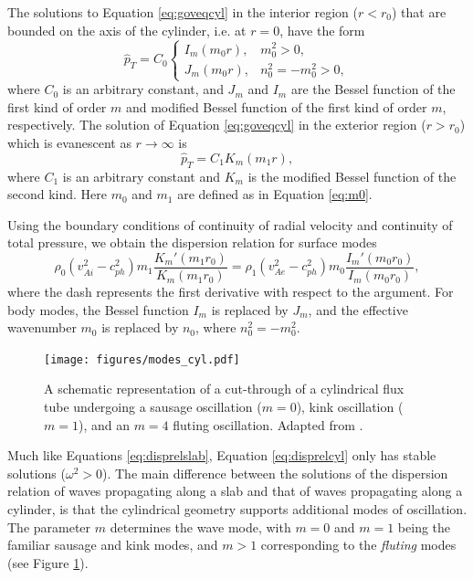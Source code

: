 The solutions to Equation \eqref{eq:goveqcyl} in the interior region ($r < r_0$) that are bounded on the axis of the cylinder, i.e. at $r = 0$, have the form
%
\begin{equation}
\label{eq:pti}
\hat p_T = C_0
\begin{cases}
I_m (m_0 r), & m_0^2 > 0,
\\
J_m (m_0 r), & n_0^2 = - m_0^2 > 0,
\end{cases}
\end{equation}
%
where $C_0$ is an arbitrary constant, and $J_m$ and $I_m$ are the Bessel function of the first kind of order $m$ and modified Bessel function of the first kind of order $m$, respectively.
The solution of Equation \eqref{eq:goveqcyl} in the exterior region ($r > r_0$) which is evanescent as $r \to \infty$ is
%
\begin{equation}
\label{eq:pte}
\hat p_T = C_1 K_m (m_1 r),
\end{equation}
%
where $C_1$ is an arbitrary constant and $K_m$ is the modified Bessel function of the second kind.
Here $m_0$ and $m_1$ are defined as in Equation \eqref{eq:m0}.

Using the boundary conditions of continuity of radial velocity and continuity of total pressure, we obtain the dispersion relation for surface modes
%
\begin{equation}
\label{eq:disprelcyl}
\rho_0 (v_{A i}^2 - c_{ph}^2) m_1 \frac{K_m'(m_1 r_0)}{K_m(m_1 r_0)}
= \rho_1 (v_{A e}^2 - c_{ph}^2) m_0 \frac{I_m'(m_0 r_0)}{I_m(m_0 r_0)},
\end{equation}
%
where the dash represents the first derivative with respect to the argument.
For body modes, the Bessel function $I_m$ is replaced by $J_m$, and the effective wavenumber $m_0$ is replaced by $n_0$, where $n_0^2 = - m_0^2$.

\begin{figure}[t]
\centering
\texttt{[image: figures/modes\_cyl.pdf]}
\caption{A schematic representation of a cut-through of a cylindrical flux tube undergoing a sausage oscillation ($m=0$), kink oscillation ($m=1$), and an $m=4$ fluting oscillation. Adapted from \cite{Murdin2001}.
}
\label{fig:modescyl}
\end{figure}

Much like Equations \eqref{eq:disprelslab}, Equation \eqref{eq:disprelcyl} only has stable solutions ($\omega^2 > 0$).
The main difference between the solutions of the dispersion relation of waves propagating along a slab and that of waves propagating along a cylinder, is that the cylindrical geometry supports additional modes of oscillation.
The parameter $m$ determines the wave mode, with $m=0$ and $m=1$ being the familiar sausage and kink modes, and $m>1$ corresponding to the \emph{fluting} modes (see Figure \ref{fig:modescyl}).

